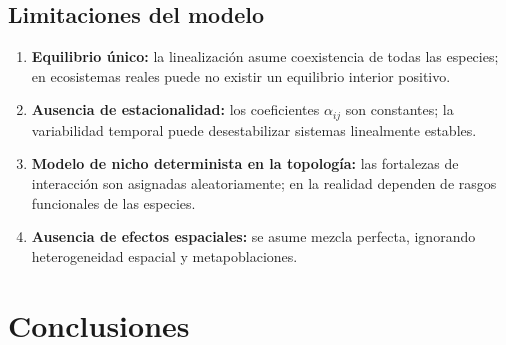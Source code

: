 \documentclass[12pt, a4paper]{article}
\begin{document}
\subsection{Limitaciones del modelo}

\begin{enumerate}[noitemsep]
    \item \textbf{Equilibrio único:} la linealización asume coexistencia de todas las
          especies; en ecosistemas reales puede no existir un equilibrio interior positivo.
    \item \textbf{Ausencia de estacionalidad:} los coeficientes $\alpha_{ij}$ son
          constantes; la variabilidad temporal puede desestabilizar sistemas
          linealmente estables.
    \item \textbf{Modelo de nicho determinista en la topología:} las fortalezas de
          interacción son asignadas aleatoriamente; en la realidad dependen de rasgos
          funcionales de las especies.
    \item \textbf{Ausencia de efectos espaciales:} se asume mezcla perfecta, ignorando
          heterogeneidad espacial y metapoblaciones.
\end{enumerate}

\section{Conclusiones}
\end{document}
